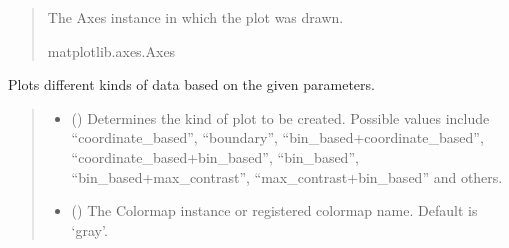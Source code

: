 \documentclass[letterpaper,10pt,english]{sphinxmanual}
\begin{document}
\begin{fulllineitems}
\begin{fulllineitems}
\begin{quote}
\begin{description}
\begin{itemize}
\end{itemize}

\sphinxAtStartPar
{} \textendash{} The Axes instance in which the plot was drawn.

\sphinxAtStartPar
matplotlib.axes.Axes

\end{description}\end{quote}

\end{fulllineitems}


\begin{fulllineitems}
\label{\detokenize{forensicfit.core.analyzer:forensicfit.core.analyzer.Analyzer.plot}}
\pysigstartsignatures
{}
\pysigstopsignatures
\sphinxAtStartPar
Plots different kinds of data based on the given parameters.
\begin{quote}\begin{description}
\begin{itemize}
\item {} 
\sphinxAtStartPar
{} () \textendash{} Determines the kind of plot to be created. Possible values include
“coordinate\_based”, “boundary”, “bin\_based+coordinate\_based”,
“coordinate\_based+bin\_based”, “bin\_based”,
“bin\_based+max\_contrast”, “max\_contrast+bin\_based” and others.

\item {} 
\sphinxAtStartPar
{} (\sphinxstyleliteralemphasis{\sphinxupquote{, }}) \textendash{} The Colormap instance or registered colormap name. Default is ‘gray’.


\end{itemize}
\end{description}
\end{quote}
\end{fulllineitems}
\end{fulllineitems}
\end{document}
